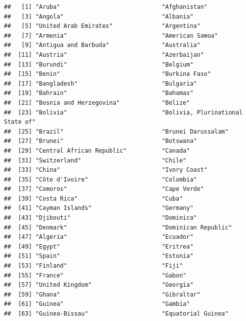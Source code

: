 \documentclass[]{article}
\begin{document}
\begin{verbatim}
##   [1] "Aruba"                             "Afghanistan"                      
##   [3] "Angola"                            "Albania"                          
##   [5] "United Arab Emirates"              "Argentina"                        
##   [7] "Armenia"                           "American Samoa"                   
##   [9] "Antigua and Barbuda"               "Australia"                        
##  [11] "Austria"                           "Azerbaijan"                       
##  [13] "Burundi"                           "Belgium"                          
##  [15] "Benin"                             "Burkina Faso"                     
##  [17] "Bangladesh"                        "Bulgaria"                         
##  [19] "Bahrain"                           "Bahamas"                          
##  [21] "Bosnia and Herzegovina"            "Belize"                           
##  [23] "Bolivia"                           "Bolivia, Plurinational State of"  
##  [25] "Brazil"                            "Brunei Darussalam"                
##  [27] "Brunei"                            "Botswana"                         
##  [29] "Central African Republic"          "Canada"                           
##  [31] "Switzerland"                       "Chile"                            
##  [33] "China"                             "Ivory Coast"                      
##  [35] "Côte d'Ivoire"                     "Colombia"                         
##  [37] "Comoros"                           "Cape Verde"                       
##  [39] "Costa Rica"                        "Cuba"                             
##  [41] "Cayman Islands"                    "Germany"                          
##  [43] "Djibouti"                          "Dominica"                         
##  [45] "Denmark"                           "Dominican Republic"               
##  [47] "Algeria"                           "Ecuador"                          
##  [49] "Egypt"                             "Eritrea"                          
##  [51] "Spain"                             "Estonia"                          
##  [53] "Finland"                           "Fiji"                             
##  [55] "France"                            "Gabon"                            
##  [57] "United Kingdom"                    "Georgia"                          
##  [59] "Ghana"                             "Gibraltar"                        
##  [61] "Guinea"                            "Gambia"                           
##  [63] "Guinea-Bissau"                     "Equatorial Guinea"                

\end{verbatim}
\end{document}
